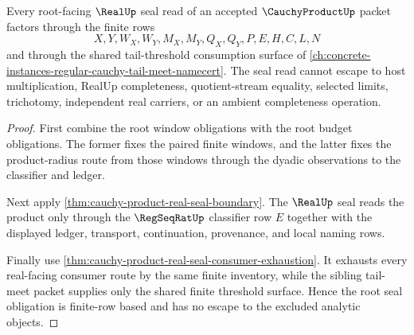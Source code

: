 \begin{theorem}
\label{thm:cauchy-product-root-real-seal-obligations}
Every root-facing $\RealUp$ seal read of an accepted $\CauchyProductUp$ packet factors through the finite rows
$$
X,Y,W_X,W_Y,M_X,M_Y,Q_X,Q_Y,P,E,H,C,L,N
$$
and through the shared tail-threshold consumption surface of \autoref{ch:concrete-instances-regular-cauchy-tail-meet-namecert}. The seal read cannot escape to host multiplication, RealUp completeness, quotient-stream equality, selected limits, trichotomy, independent real carriers, or an ambient completeness operation.
\end{theorem}
\begin{proof}
First combine the root window obligations with the root budget obligations. The former fixes the paired finite windows, and the latter fixes the product-radius route from those windows through the dyadic observations to the classifier and ledger.

Next apply \autoref{thm:cauchy-product-real-seal-boundary}. The $\RealUp$ seal reads the product only through the $\RegSeqRatUp$ classifier row $E$ together with the displayed ledger, transport, continuation, provenance, and local naming rows.

Finally use \autoref{thm:cauchy-product-real-seal-consumer-exhaustion}. It exhausts every real-facing consumer route by the same finite inventory, while the sibling tail-meet packet supplies only the shared finite threshold surface. Hence the root seal obligation is finite-row based and has no escape to the excluded analytic objects.
\end{proof}

